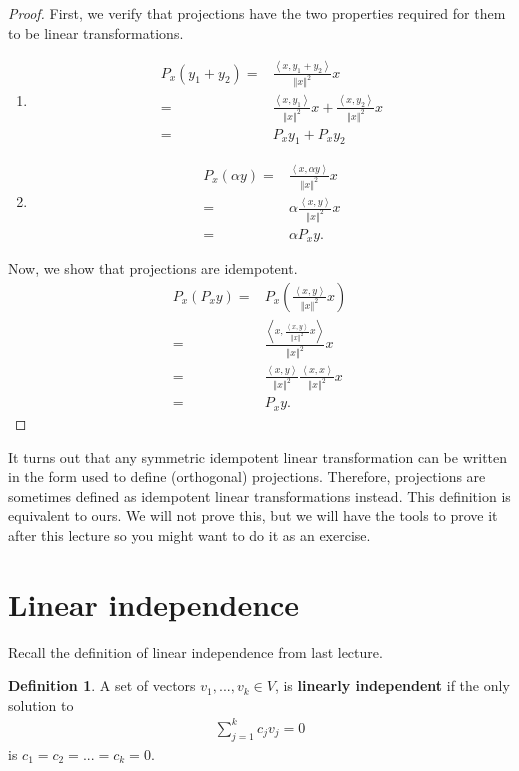 \documentclass[12pt,reqno]{amsart}
\theoremstyle{definition}
\newtheorem{definition}{Definition}[section]
\newcommand{\iprod}[2]{\left\langle {#1} , {#2} \right\rangle}
\newcommand{\norm}[1]{\left\Vert {#1} \right\Vert}
\begin{document}
\begin{proof}
  First, we verify that projections have the two properties required
  for them to be linear transformations.
  \begin{enumerate}
  \item \begin{align*}
      P_x (y_1 + y_2) = & \frac{\iprod{x}{y_1+y_2}}{\norm{x}^2} x \\
      = & \frac{\iprod{x}{y_1}}{\norm{x}^2} x +
      \frac{\iprod{x}{y_2}}{\norm{x}^2}x   \\
      = & P_x y_1 + P_x y_2 
    \end{align*}
  \item \begin{align*}
      P_x(\alpha y) = & \frac{\iprod{x}{\alpha y}}{\norm{x}^2} x \\
      =& \alpha \frac{\iprod{x}{y}}{\norm{x}^2} x \\
      = & \alpha P_x y.
    \end{align*}
  \end{enumerate}
  Now, we show that projections are idempotent. 
  \begin{align*}
    P_x (P_x y) = & P_x\left(\frac{\iprod{x}{y}}{\norm{x}^2} x \right)
    \\
    = & \frac{\iprod{x}{\frac{\iprod{x}{y}}{\norm{x}^2} x}}{\norm{x}^2} x \\
    = & \frac{\iprod{x}{y}}{\norm{x}^2}
    \frac{\iprod{x}{x}}{\norm{x}^2} x \\
    = & P_x y.
  \end{align*}
\end{proof}
It turns out that any symmetric idempotent linear transformation can
be written in the form used to define (orthogonal)
projections. Therefore, projections are sometimes defined as
idempotent linear transformations instead. This definition is
equivalent to ours. We will not prove this, but we will have the tools
to prove it after this lecture so you might want to do it as an
exercise.

\section{Linear independence}

Recall the definition of linear independence from last lecture. 
\begin{definition}
  A set of vectors $v_1, ..., v_k \in V$, is \textbf{linearly
    independent} if the only solution to
  \begin{align*}
    \sum_{j=1}^k c_j v_j = 0 
  \end{align*}
  is $c_1 = c_2 = ... = c_k = 0$. 
\end{definition}
\end{document}
